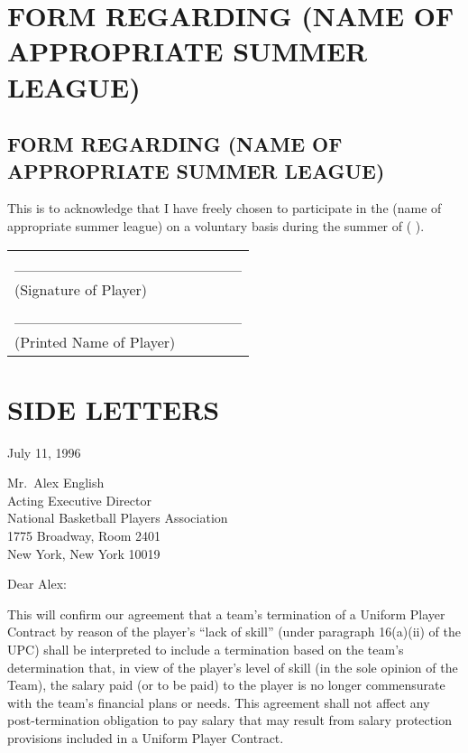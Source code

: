 \documentclass[
]{book}
\begin{document}
\hypertarget{form-regarding-name-of-appropriate-summer-league}{%
\chapter{FORM REGARDING (NAME OF APPROPRIATE SUMMER LEAGUE)}\label{form-regarding-name-of-appropriate-summer-league}}

\hypertarget{form-regarding-name-of-appropriate-summer-league-1}{%
\section{FORM REGARDING (NAME OF APPROPRIATE SUMMER LEAGUE)}\label{form-regarding-name-of-appropriate-summer-league-1}}

This is to acknowledge that I have freely chosen to participate in the (name of appropriate summer league) on a voluntary basis during the summer of ( ).

\begin{longtable}[]{@{}l@{}}
\toprule()
\endhead
\_\_\_\_\_\_\_\_\_\_\_\_\_\_\_\_\_\_\_\_\_ \\
(Signature of Player) \\
\_\_\_\_\_\_\_\_\_\_\_\_\_\_\_\_\_\_\_\_\_ \\
(Printed Name of Player) \\
\bottomrule()
\end{longtable}

\hypertarget{side-letters}{%
\chapter{SIDE LETTERS}\label{side-letters}}

July 11, 1996

Mr.~Alex English\\
Acting Executive Director\\
National Basketball Players Association\\
1775 Broadway, Room 2401\\
New York, New York 10019

Dear Alex:

This will confirm our agreement that a team's termination of a Uniform Player Contract by reason of the player's ``lack of skill'' (under paragraph 16(a)(ii) of the UPC) shall be interpreted to include a termination based on the team's determination that, in view of the player's level of skill (in the sole opinion of the Team), the salary paid (or to be paid) to the player is no longer commensurate with the team's financial plans or needs. This agreement shall not affect any post-termination obligation to pay salary that may result from salary protection provisions included in a Uniform Player Contract.
\end{document}

